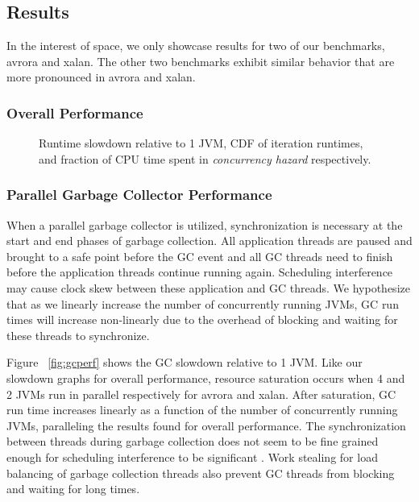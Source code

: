 \documentclass{sig-alternate}
\begin{document}
\subsection{Results}
In the interest of space, we only showcase results for two of our benchmarks, avrora and xalan. The other two benchmarks exhibit similar behavior that are more pronounced in avrora and xalan.

\subsubsection{Overall Performance}

\begin{figure*}

\centering
{}
\caption{Runtime slowdown relative to 1 JVM, CDF of iteration runtimes, and fraction of CPU time spent in \textit{concurrency hazard} respectively.}
\end{figure*}

\subsubsection{Parallel Garbage Collector Performance} \label{sssec:overallperfresults}
When a parallel garbage collector is utilized, synchronization is necessary at the start and end phases of garbage collection. All application threads are paused and brought to a safe point before the GC event and all GC threads need to finish before the application threads continue running again. Scheduling interference may cause clock skew between these application and GC threads. We hypothesize that as we linearly increase the number of concurrently running JVMs, GC run times will increase non-linearly due to the overhead of blocking and waiting for these threads to synchronize.

Figure ~\ref{fig:gcperf} shows the GC slowdown relative to 1 JVM. Like our slowdown graphs for overall performance, resource saturation occurs when 4 and 2 JVMs run in parallel respectively for avrora and xalan. After saturation, GC run time increases linearly as a function of the number of concurrently running JVMs, paralleling the results found for overall performance. The synchronization between threads during garbage collection does not seem to be fine grained enough for scheduling interference to be significant \cite{feitelson1992gang}. Work stealing for load balancing of garbage collection threads also prevent GC threads from blocking and waiting for long times.
\end{document}
